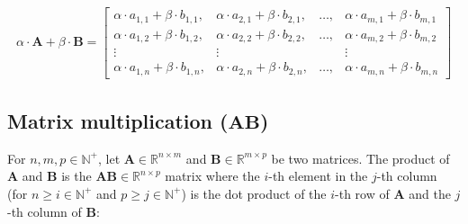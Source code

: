 \documentclass[titlepage]{article}
\begin{document}
        \begin{align*}
          \alpha \cdot \mathbf{A} + \beta \cdot \mathbf{B}
            = \begin{bmatrix}
                \alpha \cdot a_{1,1} + \beta \cdot b_{1,1},
                  & \alpha \cdot a_{2,1} + \beta \cdot b_{2,1},
                  & \ldots,
                  & \alpha \cdot a_{m,1} + \beta \cdot b_{m,1} \\
                \alpha \cdot a_{1,2} + \beta \cdot b_{1,2},
                  & \alpha \cdot a_{2,2} + \beta \cdot b_{2,2},
                  & \ldots,
                  & \alpha \cdot a_{m,2} + \beta \cdot b_{m,2} \\
                \vdots & \vdots & & \vdots \\
                \alpha \cdot a_{1,n} + \beta \cdot b_{1,n},
                  & \alpha \cdot a_{2,n} + \beta \cdot b_{2,n},
                  & \ldots,
                  & \alpha \cdot a_{m,n} + \beta \cdot b_{m,n}
              \end{bmatrix}
        \end{align*}

      \subsection{Matrix multiplication ($\mathbf{AB}$)}

        For $n, m, p \in \mathbb{N}^+$, let
        $\mathbf{A} \in \mathbb{R}^{n \times m}$ and
        $\mathbf{B} \in \mathbb{R}^{m \times p}$ be two matrices.
        The product of $\mathbf{A}$ and $\mathbf{B}$ is the
        $\mathbf{AB} \in \mathbb{R}^{n \times p}$ matrix where the $i$-th
        element in the $j$-th column (for $n \geq i \in \mathbb{N}^+$ and
        $p \geq j \in \mathbb{N}^+$) is the dot product of the $i$-th row
        of $\mathbf{A}$ and the $j$-th column of $\mathbf{B}$:
\end{document}
